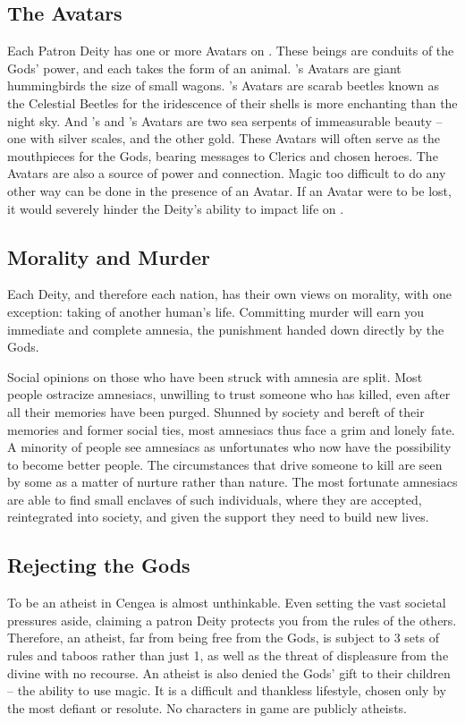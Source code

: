 \documentclass[blue]{GL2020}
\begin{document}
\subsection*{The Avatars}
Each Patron Deity has one or more Avatars on \pEarth{}. These beings are conduits of the Gods' power, and each takes the form of an animal. \cFarmGod{}'s Avatars are giant hummingbirds the size of small wagons. \cTechGod{}'s Avatars are scarab beetles known as the Celestial Beetles for the iridescence of their shells is more enchanting than the night sky. And \cEbb{}'s and \cFlow{}'s Avatars are two sea serpents of immeasurable beauty -- one with silver scales, and the other gold. These Avatars will often serve as the mouthpieces for the Gods, bearing messages to Clerics and chosen heroes. The Avatars are also a source of power and connection. Magic too difficult to do any other way can be done in the presence of an Avatar. If an Avatar were to be lost, it would severely hinder the Deity's ability to impact life on \pEarth{}.

\subsection*{Morality and Murder}
Each Deity, and therefore each nation, has their own views on morality, with one exception: taking of another human's life. Committing murder will earn you immediate and complete amnesia, the punishment handed down directly by the Gods. 

Social opinions on those who have been struck with amnesia are split. Most people ostracize amnesiacs, unwilling to trust someone who has killed, even after all their memories have been purged. Shunned by society and bereft of their memories and former social ties, most amnesiacs thus face a grim and lonely fate. A minority of people see amnesiacs as unfortunates who now have the possibility to become better people. The circumstances that drive someone to kill are seen by some as a matter of nurture rather than nature. The most fortunate amnesiacs are able to find small enclaves of such individuals, where they are accepted, reintegrated into society, and given the support they need to build new lives. 

\subsection*{Rejecting the Gods}
To be an atheist in Cengea is almost unthinkable. Even setting the vast societal pressures aside, claiming a patron Deity protects you from the rules of the others. Therefore, an atheist, far from being free from the Gods, is subject to 3 sets of rules and taboos rather than just 1, as well as the threat of displeasure from the divine with no recourse. An atheist is also denied the Gods' gift to their children -- the ability to use magic. It is a difficult and thankless lifestyle, chosen only by the most defiant or resolute. No characters in game are publicly atheists.
\end{document}
